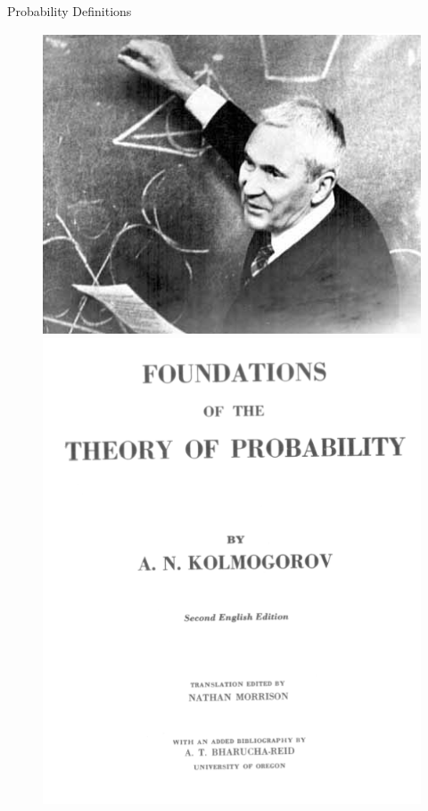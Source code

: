 \documentclass[8pt, usepdftitle = false]{beamer}
\begin{document}
\begin{frame}[allowframebreaks]{Probability Definitions}
\begin{itemize}
\begin{figure}
\includegraphics[scale = .4]{Images/kolmogorov1.png}
\includegraphics[scale = .2]{Images/kolmogorov_book.png}

\end{figure}



\end{itemize}
\end{frame}
\end{document}
